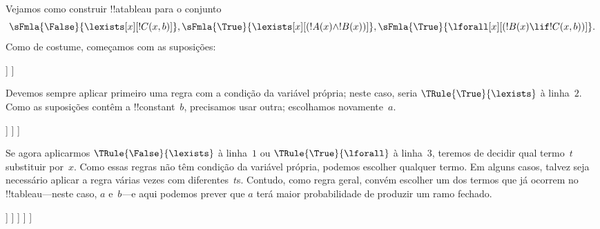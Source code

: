 \documentclass[../../../include/open-logic-section]{subfiles}
\begin{document}
\begin{ex}
Vejamos como construir !!a{tableau} para o conjunto
\[
\sFmla{\False}{\lexists[x][!C(x,b)]},
\sFmla{\True}{\lexists[x][(!A(x) \land !B(x))]},
\sFmla{\True}{\lforall[x][(!B(x) \lif !C(x,b))]}.
\]
Como de costume, começamos com as suposições:
\begin{oltableau}
  [\sFmla{\False}{\lexists[x][\formula{C}(x,b)]}, just=\TAss
    [\sFmla{\True}{\lexists[x][(\formula{A}(x) \land \formula{B}(x))]},
      just=\TAss
      [\sFmla{\True}{\lforall[x][(\formula{B}(x) \lif \formula{C}(x,b))]},
        just=\TAss]
    ]
  ]
\end{oltableau}
Devemos sempre aplicar primeiro uma regra com a condição da variável própria;
neste caso, seria $\TRule{\True}{\lexists}$ à
linha~$2$. Como as suposições contêm a !!{constant}~$b$, precisamos
usar outra; escolhamos novamente~$a$.
\begin{oltableau}
  [\sFmla{\False}{\lexists[x][\formula{C}(x,b)]}, just=\TAss
    [\sFmla{\True}{\lexists[x][(\formula{A}(x) \land \formula{B}(x))]},
      just=\TAss, checked
      [\sFmla{\True}{\lforall[x][(\formula{B}(x) \lif \formula{C}(x,b))]},
        just=\TAss
        [\sFmla{\True}{\formula{A}(a) \land \formula{B}(a)},
          just={\TRule{\True}{\lexists}[2]}]
      ]
    ]
  ]
\end{oltableau}
Se agora aplicarmos $\TRule{\False}{\lexists}$ à linha~$1$ ou
$\TRule{\True}{\lforall}$ à linha~$3$, teremos de decidir qual termo~$t$
substituir por~$x$. Como essas regras não têm condição da variável própria,
podemos escolher qualquer termo. Em alguns casos, talvez seja necessário
aplicar a regra várias vezes com diferentes~$t$s. Contudo, como regra
geral, convém escolher um dos termos que já ocorrem no
!!{tableau}---neste caso, $a$ e~$b$---e aqui podemos
prever que $a$ terá maior probabilidade de produzir um ramo fechado.
\begin{oltableau}
  [\sFmla{\False}{\lexists[x][\formula{C}(x,b)]}, just=\TAss
    [\sFmla{\True}{\lexists[x][(\formula{A}(x) \land \formula{B}(x))]},
      just=\TAss, checked
      [\sFmla{\True}{\lforall[x][(\formula{B}(x) \lif \formula{C}(x,b))]}, just=\TAss
        [\sFmla{\True}{\formula{A}(a) \land \formula{B}(a)}, just={\TRule{\True}{\lexists}[2]}
          [\sFmla{\False}{\formula{C}(a,b)}, just={\TRule{\False}{\lexists}[1]}
            [\sFmla{\True}{\formula{B}(a) \lif \formula{C}(a,b)},
              just={\TRule{\True}{\lforall}[3]}
            ]
          ]
        ]
      ]
    ]
  ]
\end{oltableau}

\end{ex}
\end{document}

